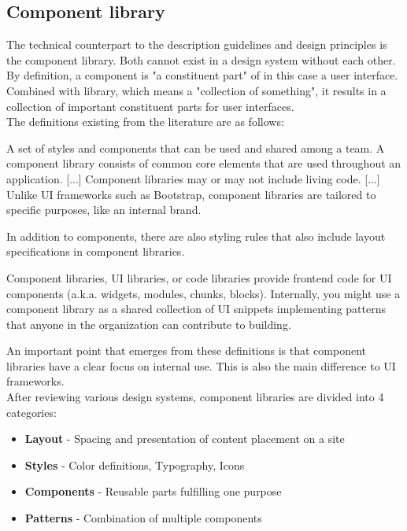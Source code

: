 \subsection{Component library}
The technical counterpart to the description guidelines and design principles is the component library. Both cannot exist in a design system without each other.  By definition, a component is "a constituent part"  of in this case a user interface. \cite{component_definition} Combined with library, which means a "collection of something", it results in a collection of important constituent parts for user interfaces. \cite{library_definition} \\
The definitions existing from the literature are as follows:
\begin{tcolorbox}[title=Definition of component library by \citet*{vesselov_building_2019}]
A set of styles and components that can be used and shared among a team. A component library consists of common core elements that are used throughout an application. [...] Component libraries may or may not include living code. [...] Unlike \ac{UI} frameworks such as Bootstrap, component libraries are tailored to specific purposes, like an internal brand.
\end{tcolorbox}
In addition to components, there are also styling rules that also include layout specifications in component libraries. 
\begin{tcolorbox}[title=Definition of component library by \citet*{macdonald_practical_2019}]
Component libraries, \ac{UI} libraries, or code libraries provide frontend code for \ac{UI} components (a.k.a. widgets, modules, chunks, blocks). Internally, you might use a component library as a shared collection of \ac{UI} snippets implementing patterns that anyone in the organization can contribute to building.
\end{tcolorbox}
An important point that emerges from these definitions is that component libraries have a clear focus on internal use. This is also the main difference to \ac{UI} frameworks. \\
After reviewing various design systems, component libraries are divided into 4 categories:
\begin{itemize}
	\item \textbf{Layout} - Spacing and presentation of content placement on a site
	\item \textbf{Styles} - Color definitions, Typography, Icons
	\item \textbf{Components} - Reusable parts fulfilling one purpose
	\item \textbf{Patterns} - Combination of multiple components 
\end{itemize}

